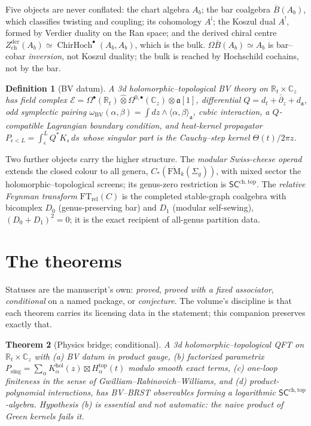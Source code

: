 \documentclass[11pt]{article}
\providecommand{\cE}{\mathcal{E}}
\providecommand{\bC}{\mathbb{C}}
\providecommand{\bR}{\mathbb{R}}
\providecommand{\barB}{\overline{B}}
\providecommand{\FM}{\overline{\mathrm{FM}}}
\providecommand{\ChirHoch}{\operatorname{ChirHoch}}
\providecommand{\Zder}{Z^{\mathrm{der}}_{\mathrm{ch}}}
\providecommand{\SCchtop}{\mathsf{SC}^{\mathrm{ch,top}}}
\newtheorem{theorem}{Theorem}[section]
\newtheorem{definition}[theorem]{Definition}
\begin{document}
Five objects are never conflated: the chart algebra $A_b$; the bar
coalgebra $\barB(A_b)$, which classifies twisting and coupling; its
cohomology $A^{\mathrm i}$; the Koszul dual $A^!$, formed by Verdier
duality on the Ran space; and the derived chiral centre
$\Zder(A_b)\simeq\ChirHoch^\bullet(A_b,A_b)$, which is the bulk.
$\Omega\barB(A_b)\simeq A_b$ is bar--cobar \emph{inversion}, not Koszul
duality; the bulk is reached by Hochschild cochains, not by the bar.

\begin{definition}[BV datum]
A 3d holomorphic--topological BV theory on $\bR_t\times\bC_z$ has field
complex
$\cE=\Omega^\bullet(\bR_t)\widehat\otimes\Omega^{0,\bullet}(\bC_z)
\otimes\mathfrak a[1]$,
differential $Q=d_t+\bar\partial_z+d_{\mathfrak a}$, odd symplectic
pairing $\omega_{\mathrm{BV}}(\alpha,\beta)=\int dz\wedge
\langle\alpha,\beta\rangle_{\mathfrak a}$, cubic interaction, a
$Q$-compatible Lagrangian boundary condition, and heat-kernel
propagator $P_{\epsilon<L}=\int_\epsilon^LQ^*K_s\,ds$ whose singular
part is the Cauchy--step kernel $\Theta(t)/2\pi z$.
\end{definition}

Two further objects carry the higher structure. The \emph{modular
Swiss-cheese operad} extends the closed colour to all genera,
$C_*(\FM_k(\Sigma_g))$, with mixed sector the holomorphic--topological
screens; its genus-zero restriction is $\SCchtop$. The \emph{relative
Feynman transform} $\mathrm{FT}_{\mathrm{rel}}(C)$ is the completed
stable-graph coalgebra with bicomplex $D_0$ (genus-preserving bar) and
$D_1$ (modular self-sewing), $(D_0+D_1)^2=0$; it is the exact recipient
of all-genus partition data.

\section{The theorems}\label{sec:theorems}

Statuses are the manuscript's own: \emph{proved}, \emph{proved with a
fixed associator}, \emph{conditional} on a named package, or
\emph{conjecture}. The volume's discipline is that each theorem carries
its licensing data in the statement; this companion preserves exactly
that.

\begin{theorem}[Physics bridge; conditional]\label{thm:bridge}
A 3d holomorphic--topological QFT on $\bR_t\times\bC_z$ with
\textup{(a)} BV datum in product gauge, \textup{(b)} factorized
parametrix $P_{\mathrm{sing}}=\sum_\alpha K^{\mathrm{hol}}_\alpha(z)
\boxtimes H^{\mathrm{top}}_\alpha(t)$ modulo smooth exact terms,
\textup{(c)} one-loop finiteness in the sense of
Gwilliam--Rabinovich--Williams, and \textup{(d)} product-polynomial
interactions, has BV--BRST observables forming a logarithmic
$\SCchtop$-algebra. Hypothesis \textup{(b)} is essential and not
automatic: the naive product of Green kernels fails it.
\end{theorem}
\end{document}
